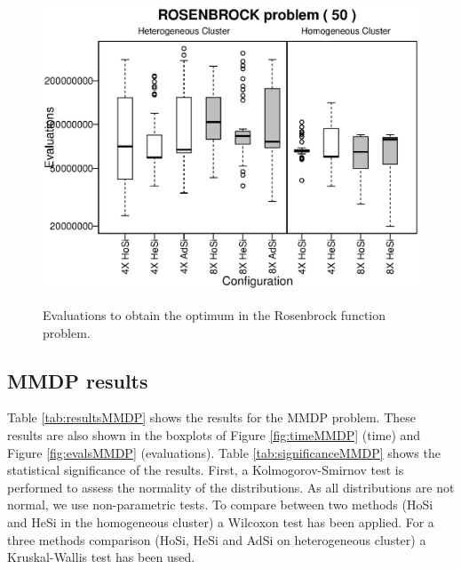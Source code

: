 \documentclass[final,1p,times]{elsarticle}
\begin{document}
\begin{figure}[ht]
{   \includegraphics[scale =0.5] {boxplots/ROSENBROCK_50_EVALS.eps}
   \label{fig:50evals}
 }
\caption{Evaluations to obtain the optimum in the Rosenbrock function problem.}
\label{fig:evalsROSENBROCK}
\end{figure}




\subsection{MMDP results}

Table \ref{tab:resultsMMDP} shows the results for the MMDP problem. These results are also shown in the boxplots of Figure \ref{fig:timeMMDP} (time) and Figure \ref{fig:evalsMMDP} (evaluations). Table \ref{tab:significanceMMDP} shows the statistical significance of the results. First, a Kolmogorov-Smirnov test is performed to assess the normality of the distributions. As all distributions are not normal, we use non-parametric tests. To compare between two methods (HoSi and HeSi in the homogeneous cluster) a Wilcoxon test has been applied. For a three methods comparison (HoSi, HeSi and AdSi on heterogeneous cluster) a Kruskal-Wallis test has been used. %
\end{document}
